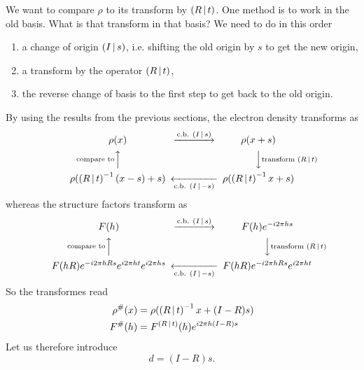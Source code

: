 \documentclass[11pt]{article}
\begin{document}
We want to compare $\rho$ to its transform by $\left( R\,\vert\, t \right)$. One method is to work in the old basis. What is that transform in that basis? We need to do in this order
\begin{enumerate}
\item a change of origin $\left( I\,\vert\, s \right)$, i.e. shifting the old origin by $s$ to get the new origin,
\item a transform by the operator $\left( R\,\vert\, t \right)$,
\item the reverse change of basis to the first step to get back to the old origin.
\end{enumerate}
By using the results from the previous sections, the electron density transforms as
\begin{equation*}
\begin{CD}
\rho(x)                                  @>{\text{c.b. } \sym{I}{s}}>>   \rho(x+s)                               \\
@A{\text{compare to}}AA                                      @VV{\text{transform } \sym{R}{t}}V         \\
\rho(\sym{R}{t}^{-1}(x-s) + s)   @<<{\text{c.b. } \sym{I}{-s}}< \rho(\sym{R}{t}^{-1}x + s)
\end{CD}
\end{equation*}
whereas the structure factors transform as
\begin{equation*}
\begin{CD}
F(h)                                  @>{\text{c.b. } \sym{I}{s}}>>   F(h)e^{-i2\pi hs}            \\
@A{\text{compare to}}AA                                      @VV{\text{transform } \sym{R}{t}}V    \\
F(hR)e^{-i2\pi hRs}e^{i2\pi ht}e^{i2\pi hs}   @<<{\text{c.b. } \sym{I}{-s}}< F(hR)e^{-i2\pi hRs}e^{i2\pi ht}
\end{CD}
\end{equation*}
So the transformes read
\begin{align}
\rho^\#(x) &= \rho(\left( R\,\vert\, t \right)^{-1}x + (I-R)s)\\
F^\#(h) &= F^{\left( R\,\vert\, t \right)}(h) e^{i2\pi h(I-R)s} \label{translation::search::F}
\end{align}
Let us therefore introduce
\begin{equation}
d = (I-R)s. \label{def::d}
\end{equation}
\end{document}
